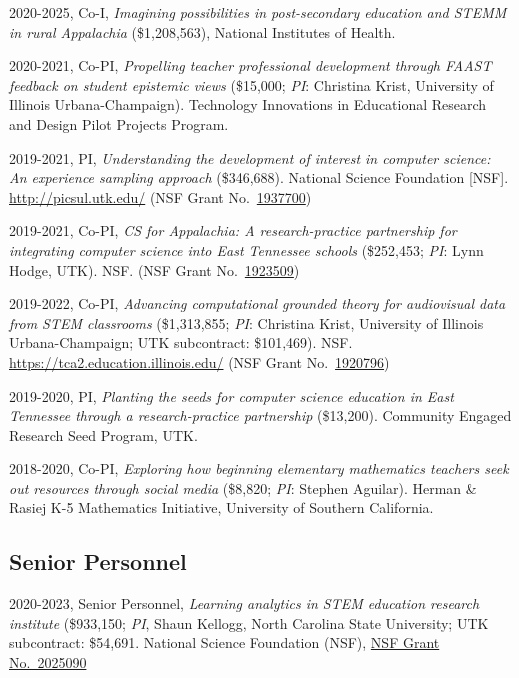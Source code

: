 \documentclass[
  14,
]{article}
\begin{document}
2020-2025, Co-I, \emph{Imagining possibilities in post-secondary
education and STEMM in rural Appalachia} (\$1,208,563), National
Institutes of Health.

2020-2021, Co-PI, \emph{Propelling teacher professional development
through FAAST feedback on student epistemic views} (\$15,000; \emph{PI}:
Christina Krist, University of Illinois Urbana-Champaign). Technology
Innovations in Educational Research and Design Pilot Projects Program.

2019-2021, PI, \emph{Understanding the development of interest in
computer science: An experience sampling approach} (\$346,688). National
Science Foundation {[}NSF{]}. \url{http://picsul.utk.edu/} (NSF Grant
No.~\href{https://www.nsf.gov/awardsearch/showAward?AWD_ID=1937700\&HistoricalAwards=false}{1937700})

2019-2021, Co-PI, \emph{CS for Appalachia: A research-practice
partnership for integrating computer science into East Tennessee
schools} (\$252,453; \emph{PI}: Lynn Hodge, UTK). NSF. (NSF Grant
No.~\href{https://www.nsf.gov/awardsearch/showAward?AWD_ID=1923509\&HistoricalAwards=false}{1923509})

2019-2022, Co-PI, \emph{Advancing computational grounded theory for
audiovisual data from STEM classrooms} (\$1,313,855; \emph{PI}:
Christina Krist, University of Illinois Urbana-Champaign; UTK
subcontract: \$101,469). NSF. \url{https://tca2.education.illinois.edu/}
(NSF Grant
No.~\href{https://www.nsf.gov/awardsearch/showAward?AWD_ID=1920796\&HistoricalAwards=false}{1920796})

2019-2020, PI, \emph{Planting the seeds for computer science education
in East Tennessee through a research-practice partnership} (\$13,200).
Community Engaged Research Seed Program, UTK.

2018-2020, Co-PI, \emph{Exploring how beginning elementary mathematics
teachers seek out resources through social media} (\$8,820; \emph{PI}:
Stephen Aguilar). Herman \& Rasiej K-5 Mathematics Initiative,
University of Southern California.

\hypertarget{senior-personnel}{%
\subsection{Senior Personnel}\label{senior-personnel}}

2020-2023, Senior Personnel, \emph{Learning analytics in STEM education
research institute} (\$933,150; \emph{PI}, Shaun Kellogg, North Carolina
State University; UTK subcontract: \$54,691. National Science Foundation
(NSF),
\href{https://www.nsf.gov/awardsearch/showAward?AWD_ID=2025090\&HistoricalAwards=false}{NSF
Grant No.~2025090}
\end{document}
